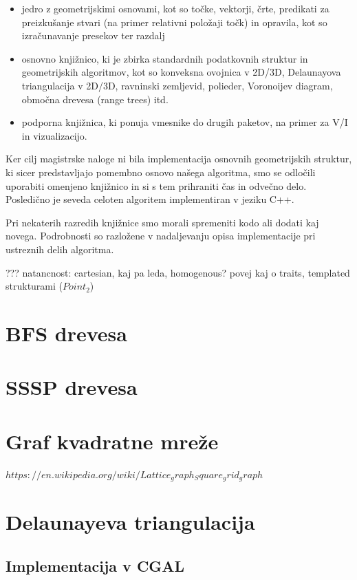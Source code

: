 \documentclass[a4paper, 12pt]{book}
\begin{document}
\begin{itemize}
\item jedro z geometrijskimi osnovami, kot so točke, vektorji, črte, predikati za preizkušanje stvari (na primer relativni položaji točk) in opravila, kot so izračunavanje presekov ter razdalj
\item osnovno knjižnico, ki je zbirka standardnih podatkovnih struktur in geometrijskih algoritmov, kot so konveksna ovojnica v 2D/3D, Delaunayova triangulacija v 2D/3D, ravninski zemljevid, polieder, Voronoijev diagram, območna drevesa (range trees) itd.
\item podporna knjižnica, ki ponuja vmesnike do drugih paketov, na primer za V/I in vizualizacijo. 
\end{itemize}

Ker cilj magistrske naloge ni bila implementacija osnovnih geometrijskih struktur, ki sicer predstavljajo pomembno osnovo našega algoritma, smo se odločili uporabiti omenjeno knjižnico in si s tem prihraniti čas in odvečno delo. Posledično je seveda celoten algoritem implementiran v jeziku C++.

Pri nekaterih razredih knjižnice smo morali spremeniti kodo ali dodati kaj novega. Podrobnosti so razložene v nadaljevanju opisa implementacije pri ustreznih delih algoritma.

??? 
natancnost: cartesian, kaj pa leda, homogenous?
povej kaj o traits, templated strukturami ($Point_2$) 

\section{BFS drevesa}
\section{SSSP drevesa}
\section{Graf kvadratne mreže}
$https://en.wikipedia.org/wiki/Lattice_graph_Square_grid_graph$

\section{Delaunayeva triangulacija}
\subsection{Implementacija v CGAL}
\end{document}
